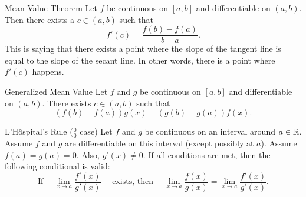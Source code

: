 \begin{ntheorem}
    {Mean Value Theorem} Let \(f\) be continuous on \([a, b]\) and differentiable on \((a, b)\). Then there exists a \(c \in (a, b)\) such that
    \[
        f'(c) = \frac{f(b) - f(a)}{b - a}.
    \]
    This is saying that there exists a point where the slope of the tangent line is equal to the slope of the secant line. In other words, there is a point where \(f'(c)\) happens.
\end{ntheorem}


\begin{ntheorem}
    {Generalized Mean Value} Let \(f\) and \(g\) be continuous on \([a,b]\) and differentiable on \((a,b)\). There exists \(c \in (a,b)\) such that
    \[
        (f(b)-f(a))g(x) - (g(b) - g(a))f(x).
    \]
\end{ntheorem}


\begin{ntheorem}
    {L'Hôspital's Rule} (\(\frac{0}{0}\) case) Let \(f\) and \(g\) be continuous on an interval around \(a \in \mathbb{R}\). Assume \(f\) and \(g\) are differentiable on this interval (except possibly at \(a\)). Assume \(f(a) = g(a) = 0\). Also, \(g'(x) \ne 0\). If all conditions are met, then the following conditional is valid:
    \[
        \text{If }\quad \lim_{x\to a}\frac{f'(x)}{g'(x)} \quad \text{ exists, then } \quad \lim_{x \to a} \frac{f(x)}{g(x)} = \lim_{x \to a} \frac{f'(x)}{g'(x)}.
    \]
\end{ntheorem}

